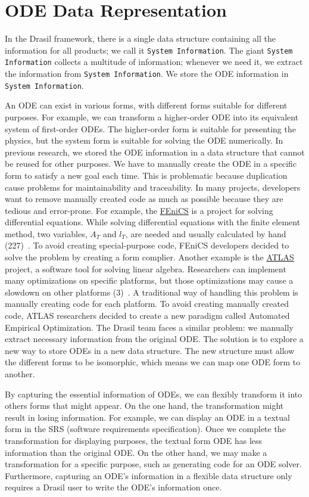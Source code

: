 \chapter{ODE Data Representation}
In the Drasil framework, there is a single data structure containing all the information for all products; we call it \verb|System Information|. The giant \verb|System Information| collects a multitude of information; whenever we need it, we extract the information from \verb|System Information|. We store the ODE information in \verb|System Information|. 

An ODE can exist in various forms, with different forms suitable for different purposes. For example, we can transform a higher-order ODE into its equivalent system of first-order ODEs. The higher-order form is suitable for presenting the physics, but the system form is suitable for solving the ODE numerically. In previous research, we stored the ODE information in a data structure that cannot be reused for other purposes. We have to manually create the ODE in a specific form to satisfy a new goal each time. This is problematic because duplication cause problems for maintainability and traceability. In many projects, developers want to remove manually created code as much as possible because they are tedious and error-prone. For example, the \href{https://fenicsproject.org/}{FEniCS} is a project for solving differential equations. While solving differential equations with the finite element method, two variables, $A_T$ and $l_T$, are needed and usually calculated by hand (227)~\citep{loggetal2012}. To avoid creating special-purpose code, FEniCS developers decided to solve the problem by creating a form complier. Another example is the \href{https://math-atlas.sourceforge.net/}{ATLAS} project, a software tool for solving linear algebra. Researchers can implement many optimizations on specific platforms, but those optimizations may cause a slowdown on other platforms (3)~\citep{whaleyetal2001}. A traditional way of handling this problem is manually creating code for each platform. To avoid creating manually created code, ATLAS researchers decided to create a new paradigm called Automated Empirical Optimization. The Drasil team faces a similar problem: we manually extract necessary information from the original ODE. The solution is to explore a new way to store ODEs in a new data structure. The new structure must allow the different forms to be isomorphic, which means we can map one ODE form to another.

By capturing the essential information of ODEs, we can flexibly transform it into others forms that might appear. On the one hand, the transformation might result in losing information. For example, we can display an ODE in a textual form in the SRS (software requirements specification). Once we complete the transformation for displaying purposes, the textual form ODE has less information than the original ODE. On the other hand, we may make a transformation for a specific purpose, such as generating code for an ODE solver. Furthermore, capturing an ODE's information in a flexible data structure only requires a Drasil user to write the ODE's information once.

